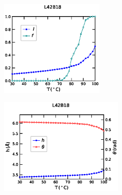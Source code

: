 \documentclass[12pt,masters,final]{UTRGVthesis}
\begin{document}
\begin{figure}[!h]
        \begin{subfigure}[b]{0.49\textwidth}
                \centering
                \includegraphics[height=1.9in, width=.8\textwidth]{L42B18_temp_lf.eps}
                \caption{}
                \label{fig:L42B18lf}
        \end{subfigure}%
        \hspace{3pt}
        \begin{subfigure}[b]{0.49\textwidth}
                \centering
                \includegraphics[height=1.9in, width=.8\textwidth]{L42B18_temp_h_theta.eps}
                \caption{}
                \label{fig:L42B18htheta}
        \end{subfigure}%
        

\end{figure}
\end{document}
